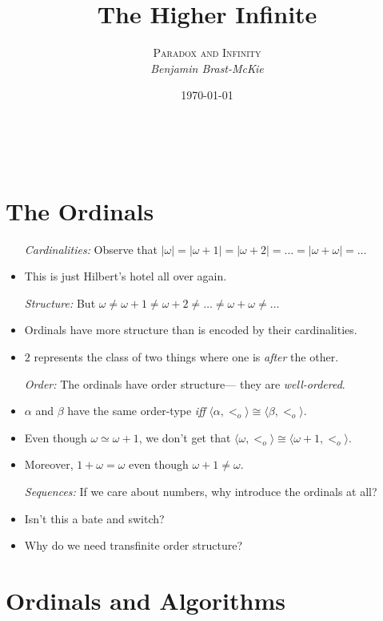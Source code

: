\documentclass[a4paper, 11pt]{article} %
\title{\textbf{The Higher Infinite}} %
\author{\textsc{Paradox and Infinity}\\ \em Benjamin Brast-McKie} %
\date{\today} %
\makeatletter
\newcommand{\tuple}[1]{\langle#1\rangle} %
\newcommand{\abs}[1]{|#1|} %
\renewcommand{\maketitle}{ %
\begin{flushright} %
{\LARGE\@title} %

\vspace{10pt} %

{\@author} %
\\\@date %

\vspace{-10pt} %
\end{flushright}
}
\makeatother
\begin{document}
\maketitle %

\thispagestyle{empty}





\section*{The Ordinals}

\begin{itemize}
  \item[\it Cardinalities:] Observe that $\abs{\omega}=\abs{\omega + 1}=\abs{\omega+2}=\ldots=\abs{\omega+\omega}=\ldots$
    \item This is just Hilbert's hotel all over again.
  \item[\it Structure:] But $\omega \neq \omega + 1 \neq \omega + 2 \neq \ldots \neq \omega + \omega \neq \ldots$ 
    \item Ordinals have more structure than is encoded by their cardinalities.
    \item $2$ represents the class of two things where one is \textit{after} the other. 
  \item[\it Order:] The ordinals have order structure--- they are \textit{well-ordered}.
    \item $\alpha$ and $\beta$ have the same order-type \textit{iff} $\tuple{\alpha,<_o} \cong \tuple{\beta,<_o}$.
    \item Even though $\omega \simeq \omega + 1$, we don't get that $\tuple{\omega,<_o} \cong \tuple{\omega+1,<_o}$.
    \item Moreover, $1 + \omega = \omega$ even though $\omega +1 \neq \omega$.
  \item[\it Sequences:] If we care about numbers, why introduce the ordinals at all?
    \item Isn't this a bate and switch?
    \item Why do we need transfinite order structure?

\end{itemize}




\section*{Ordinals and Algorithms}
\end{document}

